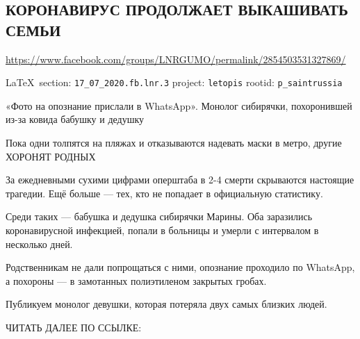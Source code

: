  
 

\subsection{КОРОНАВИРУС ПРОДОЛЖАЕТ ВЫКАШИВАТЬ СЕМЬИ}
\label{sec:17_07_2020.fb.lnr.3}
\url{https://www.facebook.com/groups/LNRGUMO/permalink/2854503531327869/}
  
\vspace{0.5cm}
{\ifDEBUG\small\LaTeX~section: \verb|17_07_2020.fb.lnr.3| project: \verb|letopis| rootid: \verb|p_saintrussia|\fi}
\vspace{0.5cm}

«Фото на опознание прислали в WhatsApp».  Монолог сибирячки, похоронившей из-за
ковида бабушку и дедушку

Пока одни толпятся на пляжах и отказываются надевать маски в метро, другие
ХОРОНЯТ РОДНЫХ

За ежедневными сухими цифрами оперштаба в 2-4 смерти скрываются настоящие
трагедии.  Ещё больше --- тех, кто не попадает в официальную статистику.

Среди таких --- бабушка и дедушка сибирячки Марины.  Оба заразились
коронавирусной инфекцией, попали в больницы и умерли с интервалом в несколько
дней.

Родственникам не дали попрощаться с ними, опознание проходило по WhatsApp, а
похороны --- в замотанных полиэтиленом закрытых гробах.

Публикуем монолог девушки, которая потеряла двух самых близких людей.

ЧИТАТЬ ДАЛЕЕ ПО ССЫЛКЕ: 
